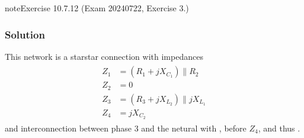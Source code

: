 \documentclass[letterpaper,10pt,italian]{jupyterBook}
\begin{document}
\begin{sphinxadmonition}{note}{Exercise 10.7.12 (Exam 2024\sphinxhyphen{}07\sphinxhyphen{}22, Exercise 3.)}



\begin{figure}[htbp]
\centering

\noindent{}
\end{figure}
\subsubsection*{Solution}

\sphinxAtStartPar
This network is a star\sphinxhyphen{}star connection with impedances
\begin{equation*}
\begin{split}\begin{aligned}
  Z_1 & = ( R_1 + j X_{C_1} ) \parallel R_2 \\
  Z_2 & = 0 \\
  Z_3 & = ( R_3 + j X_{L_2} ) \parallel j X_{L_1} \\
  Z_4 & = j X_{C_2}
\end{aligned}\end{split}
\end{equation*}
\sphinxAtStartPar
and inter\sphinxhyphen{}connection between phase \(3\) and the netural with , before \(Z_4\), and thus .


\end{sphinxadmonition}
\end{document}
